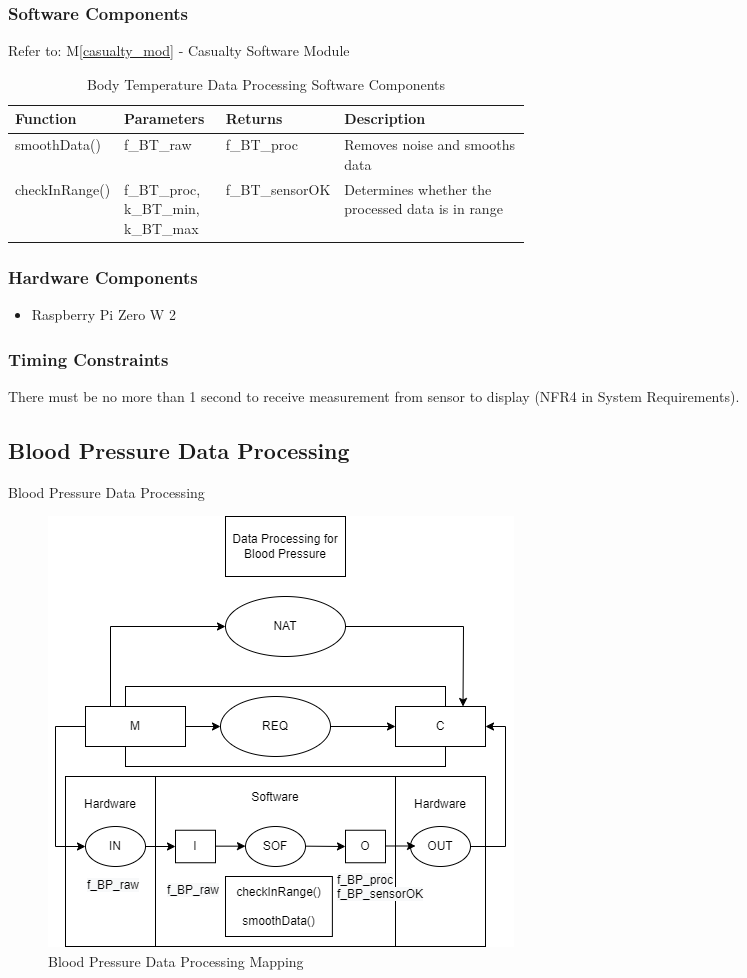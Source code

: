 \documentclass{article}
\newcounter{mnum}
\newcommand{\mthemnum}{M\themnum}
\begin{document}
\begin{description}
        \subsubsection{Software Components}
                Refer to: M\ref{casualty_mod} - Casualty Software Module

                \begin{longtable}{|l|p{0.2\linewidth}|l|p{0.4\linewidth}|}
                \caption{Body Temperature Data Processing Software Components}
                \hline
                \textbf{Function} & \textbf{Parameters} & \textbf {Returns} & \textbf{Description} \\
                \endhead
                \hline
                smoothData()   & f\_BT\_raw & f\_BT\_proc & Removes noise and smooths data \\
                \hline
                checkInRange()   & f\_BT\_proc, k\_BT\_min, k\_BT\_max & f\_BT\_sensorOK & Determines whether the processed data is in range \\
                \hline
                \end{longtable}
        \subsubsection{Hardware Components}
            \begin{itemize}
            \item Raspberry Pi Zero W 2
            \end{itemize}
        \subsubsection{Timing Constraints}
        There must be no more than 1 second to receive measurement from sensor to display (NFR4 in System Requirements).
    \newpage

    \subsection{Blood Pressure Data Processing}
    \item [\refstepcounter{mnum} \mthemnum \label{BP_DP}:] Blood Pressure Data Processing
    
    \begin{figure}[!htb]
    	\centering
    	\includegraphics[width=0.5\linewidth]{mccharts-BPDataProc.drawio.png}
    	\caption{Blood Pressure Data Processing Mapping}
    \end{figure}
    

\end{description}
\end{document}
